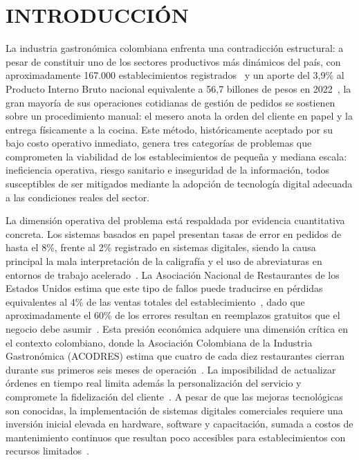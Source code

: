 \chapter{INTRODUCCIÓN}

La industria gastronómica colombiana enfrenta una contradicción estructural: a pesar de 
constituir uno de los sectores productivos más dinámicos del país, con aproximadamente 
167.000 establecimientos registrados~\cite{acodres_estadisticas_2021} y un aporte del 
3,9\% al Producto Interno Bruto nacional equivalente a 56,7 billones de pesos en 
2022~\cite{andi_pib_2024}, la gran mayoría de sus operaciones cotidianas de gestión de 
pedidos se sostienen sobre un procedimiento manual: el mesero anota la orden del cliente 
en papel y la entrega físicamente a la cocina. Este método, históricamente aceptado por 
su bajo costo operativo inmediato, genera tres categorías de problemas que comprometen la 
viabilidad de los establecimientos de pequeña y mediana escala: ineficiencia operativa, 
riesgo sanitario e inseguridad de la información, todos susceptibles de ser mitigados 
mediante la adopción de tecnología digital adecuada a las condiciones reales del sector.

La dimensión operativa del problema está respaldada por evidencia cuantitativa concreta. 
Los sistemas basados en papel presentan tasas de error en pedidos de hasta el 8\%, frente al 2\% registrado en sistemas digitales, siendo la causa principal la mala 
interpretación de la caligrafía y el uso de abreviaturas en entornos de trabajo 
acelerado~\cite{Daniel2024, LSRetail2025}. La Asociación Nacional de Restaurantes de 
los Estados Unidos estima que este tipo de fallos puede traducirse en pérdidas equivalentes 
al 4\% de las ventas totales del establecimiento~\cite{Khan2023}, dado que 
aproximadamente el 60\% de los errores resultan en reemplazos gratuitos que el negocio 
debe asumir~\cite{Checkmate2025}. Esta presión económica adquiere una dimensión crítica 
en el contexto colombiano, donde la Asociación Colombiana de la Industria Gastronómica 
(ACODRES) estima que cuatro de cada diez restaurantes cierran durante sus primeros seis 
meses de operación~\cite{acodres_estadisticas_2021}. La imposibilidad de actualizar 
órdenes en tiempo real limita además la personalización del servicio y compromete la 
fidelización del cliente~\cite{Ser2024Estrategia}. A pesar de que las mejoras tecnológicas 
son conocidas, la implementación de sistemas digitales comerciales requiere una inversión 
inicial elevada en hardware, software y capacitación, sumada a costos de mantenimiento 
continuos que resultan poco accesibles para establecimientos con recursos 
limitados~\cite{marcelo2024desafios}.

